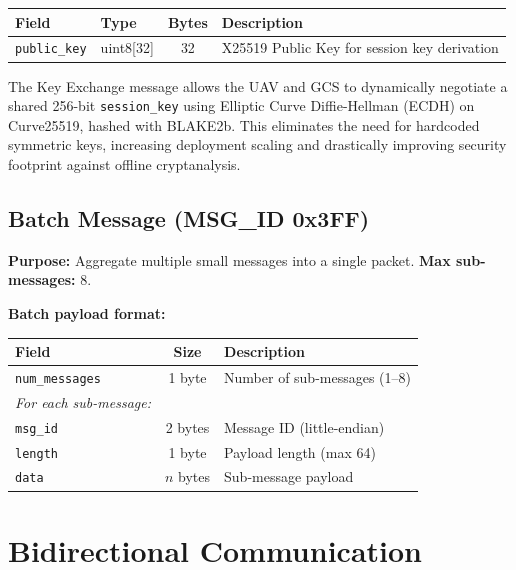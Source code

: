 \documentclass[11pt,a4paper]{article}
\begin{document}
\begin{table}[H]
\centering
\begin{tabular}{@{}llcl@{}}
\toprule
\textbf{Field} & \textbf{Type} & \textbf{Bytes} & \textbf{Description} \\
\midrule
\texttt{public\_key} & uint8[32] & 32 & X25519 Public Key for session key derivation \\
\bottomrule
\end{tabular}
\end{table}

\begin{notebox}
The Key Exchange message allows the UAV and GCS to dynamically negotiate a shared 256-bit \texttt{session\_key} using Elliptic Curve Diffie-Hellman (ECDH) on Curve25519, hashed with BLAKE2b. This eliminates the need for hardcoded symmetric keys, increasing deployment scaling and drastically improving security footprint against offline cryptanalysis.
\end{notebox}

\subsection{Batch Message (MSG\_ID 0x3FF)}

\textbf{Purpose:} Aggregate multiple small messages into a single packet. \textbf{Max sub-messages:} 8.

\textbf{Batch payload format:}
\begin{table}[H]
\centering
\begin{tabular}{@{}lcl@{}}
\toprule
\textbf{Field} & \textbf{Size} & \textbf{Description} \\
\midrule
\texttt{num\_messages} & 1 byte & Number of sub-messages (1--8) \\
\emph{For each sub-message:} & & \\
\quad \texttt{msg\_id}  & 2 bytes & Message ID (little-endian) \\
\quad \texttt{length}   & 1 byte  & Payload length (max 64) \\
\quad \texttt{data}     & $n$ bytes & Sub-message payload \\
\bottomrule
\end{tabular}
\end{table}

\newpage
\section{Bidirectional Communication}
\end{document}
